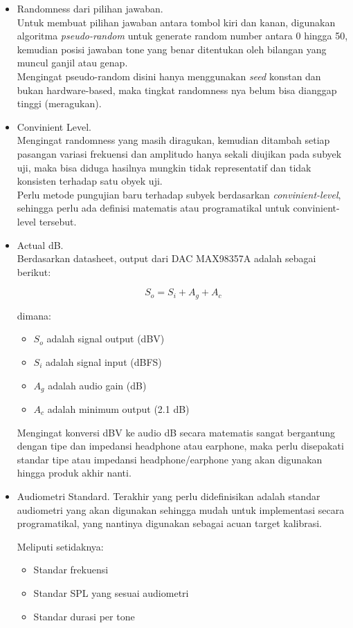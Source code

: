 \documentclass[12pt,]{article}
\begin{document}
	\begin{itemize}
		\item Randomness dari pilihan jawaban.\\
		Untuk membuat pilihan jawaban antara tombol kiri dan kanan, digunakan algoritma \textit{pseudo-random}
		untuk generate random number antara 0 hingga 50, kemudian posisi jawaban tone yang benar ditentukan oleh
		bilangan yang muncul ganjil atau genap.\\
		Mengingat pseudo-random disini hanya menggunakan \textit{seed} konstan dan bukan hardware-based,
		maka tingkat randomness nya belum bisa dianggap tinggi (meragukan).
		
		\item Convinient Level.\\
		Mengingat randomness yang masih diragukan, kemudian ditambah setiap pasangan
		variasi frekuensi dan amplitudo hanya sekali diujikan pada subyek uji, 
		maka bisa diduga hasilnya mungkin tidak representatif dan tidak konsisten terhadap satu obyek uji.\\
		Perlu metode pungujian baru terhadap subyek berdasarkan \textit{convinient-level},
		sehingga perlu ada definisi matematis atau programatikal untuk convinient-level tersebut. 
		
		\item Actual dB.\\
		Berdasarkan datasheet, output dari DAC MAX98357A adalah sebagai berikut:
		
		\[S_o = S_i + A_g + A_c\]
		
		dimana:
		\begin{itemize}
			\item $S_o$ adalah signal output (dBV)
			\item $S_i$ adalah signal input (dBFS)
			\item $A_g$ adalah audio gain (dB)
			\item $A_c$ adalah minimum output (2.1 dB)
		\end{itemize}
		
		Mengingat konversi dBV ke audio dB secara matematis sangat bergantung dengan tipe dan impedansi headphone atau earphone,
		maka perlu disepakati standar tipe atau impedansi headphone/earphone yang akan digunakan hingga produk akhir nanti. 
		
		\item Audiometri Standard.
		Terakhir yang perlu didefinisikan adalah standar audiometri yang akan digunakan sehingga mudah untuk implementasi secara programatikal,
		yang nantinya digunakan sebagai acuan target kalibrasi.
		
		Meliputi setidaknya:
		\begin{itemize}
			\item Standar frekuensi 			
			\item Standar SPL yang sesuai audiometri
			\item Standar durasi per tone
		\end{itemize}
	\end{itemize}
\end{document}
